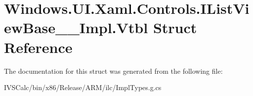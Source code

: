 \hypertarget{struct_windows_1_1_u_i_1_1_xaml_1_1_controls_1_1_i_list_view_base_____impl_1_1_vtbl}{}\section{Windows.\+U\+I.\+Xaml.\+Controls.\+I\+List\+View\+Base\+\_\+\+\_\+\+Impl.\+Vtbl Struct Reference}
\label{struct_windows_1_1_u_i_1_1_xaml_1_1_controls_1_1_i_list_view_base_____impl_1_1_vtbl}


The documentation for this struct was generated from the following file\+:\begin{DoxyCompactItemize}
\item 
I\+V\+S\+Calc/bin/x86/\+Release/\+A\+R\+M/ilc/Impl\+Types.\+g.\+cs\end{DoxyCompactItemize}
